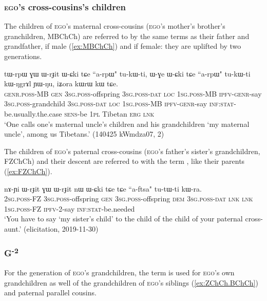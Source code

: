 \subsubsection{\textsc{ego}'s cross-cousins's children} \label{sec:MBCh.FZCh.Ch}
The children of \textsc{ego}'s maternal cross-cousins (\textsc{ego}'s mother's brother's granchildren, MBChCh) are referred to by the same terms as their father and grandfather,  if male (\ref{ex:MBChCh}) and  if female: they are uplifted by two generations.

\begin{exe}
\ex \label{ex:MBChCh}
\gll tɯ-rpɯ ɣɯ ɯ-rɟit ɯ-ɕki tɕe ``a-rpɯ" tu-kɯ-ti, ɯ-ɣe ɯ-ɕki tɕe ``a-rpɯ" tu-kɯ-ti kɯ-ŋgrɤl ɲɯ-ŋu, iʑora kɯrɯ kɯ tɕe. \\
\textsc{genr}.\textsc{poss}-MB \textsc{gen} \textsc{3sg}.\textsc{poss}-offspring \textsc{3sg}.\textsc{poss}-\textsc{dat} \textsc{loc} \textsc{1sg}.\textsc{poss}-MB \textsc{ipfv}-\textsc{genr}-say \textsc{3sg}.\textsc{poss}-grandchild \textsc{3sg}.\textsc{poss}-\textsc{dat} \textsc{loc} \textsc{1sg}.\textsc{poss}-MB \textsc{ipfv}-\textsc{genr}-say  \textsc{inf}:\textsc{stat}-be.usually.the.case \textsc{sens}-be \textsc{1pl} Tibetan \textsc{erg} \textsc{lnk} \\
\glt `One calls one's maternal uncle's children and his grandchildren  `my maternal uncle', among us Tibetans.' (140425 kWmdza07, 2)
\end{exe}

The children of \textsc{ego}'s paternal cross-cousins (\textsc{ego}'s father's sister's grandchildren, FZChCh) and their descent are referred to with the term , like their parents (\ref{ex:FZChCh}).

\begin{exe}
\ex \label{ex:FZChCh}
\gll nɤ-ɲi ɯ-rɟit ɣɯ ɯ-rɟit nɯ ɯ-ɕki tɕe tɕe ``a-ftsa" tu-tɯ-ti kɯ-ra. \\
\textsc{2sg}.\textsc{poss}-FZ \textsc{3sg}.\textsc{poss}-offspring \textsc{gen} \textsc{3sg}.\textsc{poss}-offspring \textsc{dem} \textsc{3sg}.\textsc{poss}-\textsc{dat} \textsc{lnk} \textsc{lnk} \textsc{1sg}.\textsc{poss}-FZ \textsc{ipfv}-2-say \textsc{inf}:\textsc{stat}-be.needed \\
\glt `You have to say  `my sister's child' to the child of the child of your paternal cross-aunt.' (elicitation, 2019-11-30)
\end{exe}


\subsubsection{G\textsuperscript{-2}} \label{sec:G-2}
For the generation of \textsc{ego}'s grandchildren, the term  is used for \textsc{ego}'s own grandchildren as well of the grandchildren of \textsc{ego}'s siblings (\ref{ex:ZChCh.BChCh}) and paternal parallel cousins.

